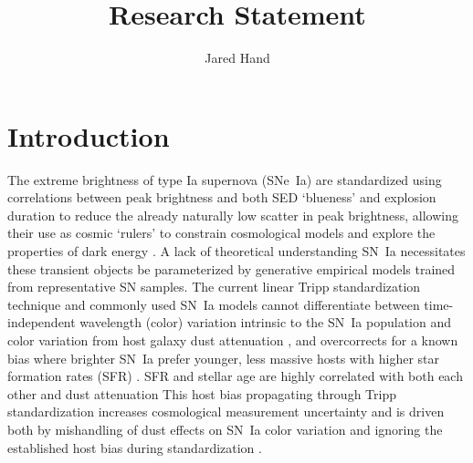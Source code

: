 \documentclass[modern]{aastex63}
\begin{document}
\title{Research Statement}

\author{Jared Hand}



\section{Introduction}
The extreme brightness of type Ia supernova (SNe~Ia) are standardized using correlations between peak brightness and both SED `blueness' and explosion duration to reduce the already naturally low scatter in peak brightness, allowing their use as cosmic `rulers' to constrain cosmological models and explore the properties of dark energy \citep{Perlmutter1999}.
A lack of theoretical understanding SN~Ia necessitates these transient objects be parameterized by generative empirical models trained from representative SN samples.
The current linear Tripp standardization technique and commonly used SN~Ia models cannot differentiate between time-independent wavelength (color) variation intrinsic to the SN~Ia population and color variation from host galaxy dust attenuation \citep{Mandel2017}, and overcorrects for a known bias where brighter SN~Ia prefer younger, less massive hosts with higher star formation rates (SFR) \citep{Sullivan2010,Rigault2018}.
SFR and stellar age are highly correlated with both each other and dust attenuation
This host bias propagating through Tripp standardization increases cosmological measurement uncertainty and is driven both by mishandling of dust effects on SN~Ia color variation and ignoring the established host bias during standardization \citep{Brout2021,Rose2021}.
\end{document}
